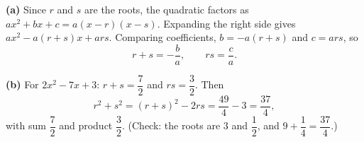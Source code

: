 \textbf{(a)} Since $r$ and $s$ are the roots, the quadratic factors as $ax^2+bx+c=a(x-r)(x-s)$. Expanding the right side gives $ax^2-a(r+s)x+ars$. Comparing coefficients, $b=-a(r+s)$ and $c=ars$, so
\[
r+s=-\dfrac {b}{a},\qquad rs=\dfrac {c}{a} .
\]

\textbf{(b)} For $2x^2-7x+3$: $r+s=\dfrac{7}{2}$ and $rs=\dfrac{3}{2}$. Then
\[
r^2+s^2=(r+s)^2-2rs=\dfrac{49}{4}-3=\boxed{\dfrac{37}{4}},
\]
with sum $\boxed{\dfrac{7}{2}}$ and product $\boxed{\dfrac{3}{2}}$. (Check: the roots are $3$ and $\dfrac{1}{2}$, and $9+\dfrac{1}{4}=\dfrac{37}{4}$.)
